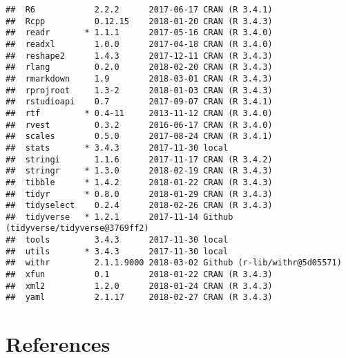 \documentclass[12pt,]{krantz}
\theoremstyle{definition}
\theoremstyle{definition}
\theoremstyle{definition}
\theoremstyle{remark}
\begin{document}
\begin{verbatim}
##  R6            2.2.2      2017-06-17 CRAN (R 3.4.1)                      
##  Rcpp          0.12.15    2018-01-20 CRAN (R 3.4.3)                      
##  readr       * 1.1.1      2017-05-16 CRAN (R 3.4.0)                      
##  readxl        1.0.0      2017-04-18 CRAN (R 3.4.0)                      
##  reshape2      1.4.3      2017-12-11 CRAN (R 3.4.3)                      
##  rlang         0.2.0      2018-02-20 CRAN (R 3.4.3)                      
##  rmarkdown     1.9        2018-03-01 CRAN (R 3.4.3)                      
##  rprojroot     1.3-2      2018-01-03 CRAN (R 3.4.3)                      
##  rstudioapi    0.7        2017-09-07 CRAN (R 3.4.1)                      
##  rtf         * 0.4-11     2013-11-12 CRAN (R 3.4.0)                      
##  rvest         0.3.2      2016-06-17 CRAN (R 3.4.0)                      
##  scales        0.5.0      2017-08-24 CRAN (R 3.4.1)                      
##  stats       * 3.4.3      2017-11-30 local                               
##  stringi       1.1.6      2017-11-17 CRAN (R 3.4.2)                      
##  stringr     * 1.3.0      2018-02-19 CRAN (R 3.4.3)                      
##  tibble      * 1.4.2      2018-01-22 CRAN (R 3.4.3)                      
##  tidyr       * 0.8.0      2018-01-29 CRAN (R 3.4.3)                      
##  tidyselect    0.2.4      2018-02-26 CRAN (R 3.4.3)                      
##  tidyverse   * 1.2.1      2017-11-14 Github (tidyverse/tidyverse@3769ff2)
##  tools         3.4.3      2017-11-30 local                               
##  utils       * 3.4.3      2017-11-30 local                               
##  withr         2.1.1.9000 2018-03-02 Github (r-lib/withr@5d05571)        
##  xfun          0.1        2018-01-22 CRAN (R 3.4.3)                      
##  xml2          1.2.0      2018-01-24 CRAN (R 3.4.3)                      
##  yaml          2.1.17     2018-02-27 CRAN (R 3.4.3)
\end{verbatim}

\chapter{References}\label{references}
\end{document}
